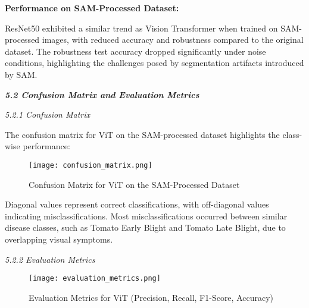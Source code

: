 \documentclass{article}
\begin{document}
\textbf{Performance on SAM-Processed Dataset:}

\begin{table}[h!]
\centering
{}
\captionsetup{font=small}
\caption{Performance Metrics of ResNet50 on SAM-Processed Dataset}
\label{tab:resnet50_sam_metrics}
\end{table}

ResNet50 exhibited a similar trend as Vision Transformer when trained on SAM-processed images, with reduced accuracy and robustness compared to the original dataset. The robustness test accuracy dropped significantly under noise conditions, highlighting the challenges posed by segmentation artifacts introduced by SAM.

\textbf{\textit{5.2 Confusion Matrix and Evaluation Metrics}}

\textit{5.2.1 Confusion Matrix}


The confusion matrix for ViT on the SAM-processed dataset highlights the class-wise performance:

\begin{figure}[H]
    \centering
    \texttt{[image: confusion\_matrix.png]} %
    \captionsetup{font=small}
    \caption{Confusion Matrix for ViT on the SAM-Processed Dataset}
\end{figure}

Diagonal values represent correct classifications, with off-diagonal values indicating misclassifications. Most misclassifications occurred between similar disease classes, such as Tomato Early Blight and Tomato Late Blight, due to overlapping visual symptoms.


\textit{5.2.2 Evaluation Metrics}

\begin{figure}[H]
    \centering
    \texttt{[image: evaluation\_metrics.png]} %
    \captionsetup{font=small}
    \caption{Evaluation Metrics for ViT (Precision, Recall, F1-Score, Accuracy)}
\end{figure}
\end{document}
